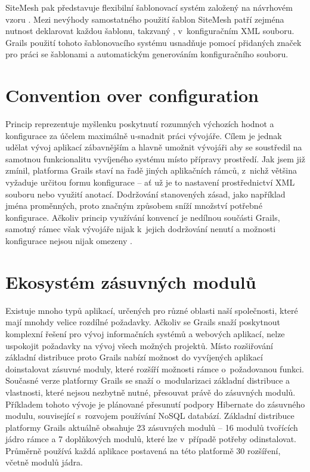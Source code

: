 \indent
SiteMesh pak představuje flexibilní šablonovací systém založený na návrhovém vzoru . Mezi nevýhody samostatného použití šablon SiteMesh patří zejména nutnost deklarovat každou šablonu, takzvaný , v~konfiguračním XML souboru. Grails použití tohoto šablonovacího systému usnadňuje pomocí přidaných značek pro práci se šablonami a automatickým generováním konfiguračního souboru.


\section{Convention over configuration}
Princip  reprezentuje myšlenku poskytnutí rozumných výchozích hodnot a konfigurace za účelem maximálně u-snadnit práci vývojáře. Cílem je jednak udělat vývoj aplikací zábavnějším a hlavně umožnit vývojáři aby se soustředil na samotnou funkcionalitu vyvíjeného systému místo přípravy prostředí. Jak jsem již zmínil, platforma Grails staví na řadě jiných aplikačních rámců, z~nichž většina vyžaduje určitou formu konfigurace -- ať už je to nastavení prostřednictví XML souboru nebo využití anotací. Dodržování stanovených zásad, jako například jména proměnných, proto značným způsobem sníží množství potřebné konfigurace. Ačkoliv princip využívání konvencí je nedílnou součásti Grails, samotný rámec však vývojáře nijak k~jejich dodržování nenutí a možnosti konfigurace nejsou nijak omezeny \cite{programming-grails}.

\section{Ekosystém zásuvných modulů}
Existuje mnoho typů aplikací, určených pro různé oblasti naší společnosti, které mají mnohdy velice rozdílné požadavky. Ačkoliv se Grails snaží poskytnout komplexní řešení pro vývoj informačních systémů a webových aplikací, nelze uspokojit požadavky na vývoj všech možných projektů. Místo
rozšiřování základní distribuce  proto Grails nabízí možnost do vyvíjených aplikací doinstalovat zásuvné moduly, které rozšíří možnosti rámce o~požadovanou funkci. Současné verze platformy Grails se snaží o~modularizaci základní distribuce a vlastnosti, které nejsou nezbytně nutné, přesouvat právě do zásuvných modulů. Příkladem tohoto vývoje je plánované přesunutí podpory Hibernate do zásuvného modulu, související s~rozvojem používání NoSQL databází. Základní distribuce platformy Grails aktuálně obsahuje 23 zásuvných modulů -- 16 modulů tvořících jádro rámce a 7 doplňkových modulů, které lze v~případě potřeby odinstalovat. Průměrně používá každá aplikace postavená na této platformě 30 rozšíření, včetně modulů jádra. \cite{programming-grails}

